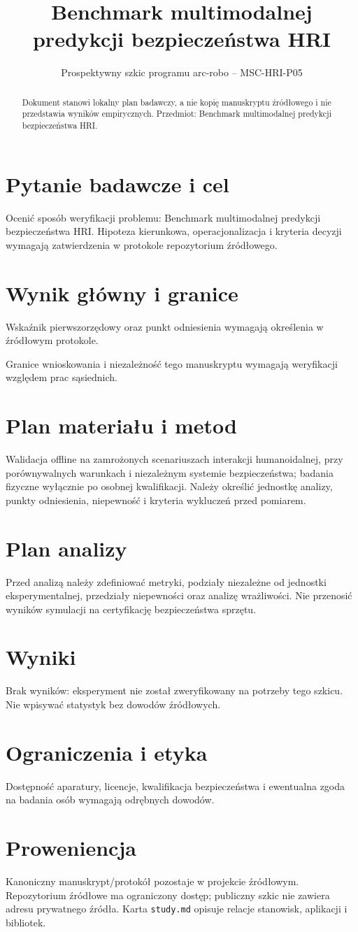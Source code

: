 \documentclass[11pt,a4paper]{article}
\title{Benchmark multimodalnej predykcji bezpieczeństwa HRI}
\author{}
\date{Prospektywny szkic programu arc-robo -- MSC-HRI-P05}
\begin{document}
\maketitle
\begin{abstract}
Dokument stanowi lokalny plan badawczy, a nie kopię manuskryptu źródłowego i nie przedstawia wyników empirycznych. Przedmiot: Benchmark multimodalnej predykcji bezpieczeństwa HRI.
\end{abstract}
\section{Pytanie badawcze i cel}
Ocenić sposób weryfikacji problemu: Benchmark multimodalnej predykcji bezpieczeństwa HRI. Hipoteza kierunkowa, operacjonalizacja i kryteria decyzji wymagają zatwierdzenia w protokole repozytorium źródłowego.
\section{Wynik główny i granice}
Wskaźnik pierwszorzędowy oraz punkt odniesienia wymagają określenia w źródłowym protokole.

Granice wnioskowania i niezależność tego manuskryptu wymagają weryfikacji względem prac sąsiednich.
\section{Plan materiału i metod}
Walidacja offline na zamrożonych scenariuszach interakcji humanoidalnej, przy porównywalnych warunkach i niezależnym systemie bezpieczeństwa; badania fizyczne wyłącznie po osobnej kwalifikacji. Należy określić jednostkę analizy, punkty odniesienia, niepewność i kryteria wykluczeń przed pomiarem.
\section{Plan analizy}
Przed analizą należy zdefiniować metryki, podziały niezależne od jednostki eksperymentalnej, przedziały niepewności oraz analizę wrażliwości. Nie przenosić wyników symulacji na certyfikację bezpieczeństwa sprzętu.
\section{Wyniki}
Brak wyników: eksperyment nie został zweryfikowany na potrzeby tego szkicu. Nie wpisywać statystyk bez dowodów źródłowych.
\section{Ograniczenia i etyka}
Dostępność aparatury, licencje, kwalifikacja bezpieczeństwa i ewentualna zgoda na badania osób wymagają odrębnych dowodów.
\section{Proweniencja}
Kanoniczny manuskrypt/protokół pozostaje w projekcie źródłowym. Repozytorium źródłowe ma ograniczony dostęp; publiczny szkic nie zawiera adresu prywatnego źródła. Karta \texttt{study.md} opisuje relacje stanowisk, aplikacji i bibliotek.
\end{document}
